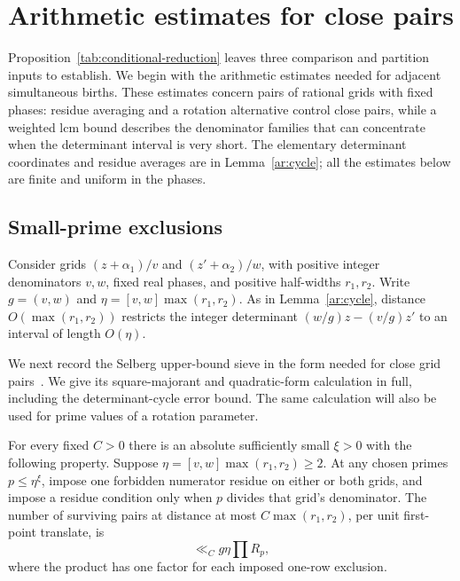 \section{Arithmetic estimates for close pairs}
\label{sec:arithmetic}

Proposition~\ref{tab:conditional-reduction} leaves three comparison and
partition inputs to establish. We begin with the arithmetic estimates
needed for adjacent simultaneous births. These estimates concern pairs
of rational grids with fixed phases: residue averaging and a rotation
alternative control close pairs, while a weighted lcm bound describes
the denominator families that can concentrate when the determinant
interval is very short. The elementary determinant coordinates and
residue averages are in Lemma~\ref{ar:cycle}; all the estimates below
are finite and uniform in the phases.

\subsection{Small-prime exclusions}

Consider grids $(z+\alpha_1)/v$ and $(z'+\alpha_2)/w$, with positive integer
denominators $v,w$, fixed real phases, and positive half-widths $r_1,r_2$.
Write $g=(v,w)$ and $\eta=[v,w]\max(r_1,r_2)$. As in
Lemma~\ref{ar:cycle}, distance $O(\max(r_1,r_2))$ restricts the integer
determinant $(w/g)z-(v/g)z'$ to an interval of length $O(\eta)$.

We next record the Selberg upper-bound sieve in the form needed
for close grid pairs~\cite{Selberg1947,Uchiyama1962}. We give its
square-majorant and quadratic-form calculation in full, including
the determinant-cycle error bound. The same calculation will also
be used for prime values of a rotation parameter.

\begin{lemma}\label{ar:sieve}
For every fixed $C>0$ there is an absolute sufficiently small $\xi>0$
with the following property. Suppose $\eta=[v,w]\max(r_1,r_2)\ge2$.
At any chosen primes $p\le\eta^\xi$, impose one forbidden numerator
residue on either or both grids, and impose a residue condition only
when $p$ divides that grid's denominator. The number of surviving pairs
at distance at most $C\max(r_1,r_2)$, per unit first-point translate, is
\[
 \ll_C g\eta\prod R_p,
\]
where the product has one factor for each imposed one-row exclusion.
\end{lemma}

